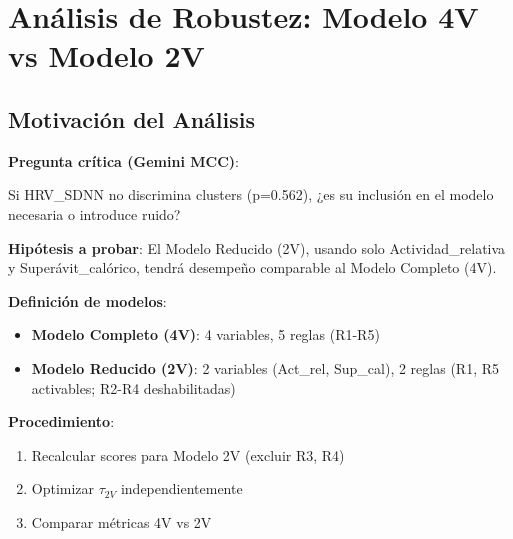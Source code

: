 \documentclass[12pt,letterpaper,twoside]{report}
\begin{document}
\section{Análisis de Robustez: Modelo 4V vs Modelo 2V}

\subsection{Motivación del Análisis}

\begin{hipotesisbox}
\textbf{Pregunta crítica (Gemini MCC)}:

Si HRV\_SDNN no discrimina clusters (p=0.562), ¿es su inclusión en el modelo necesaria o introduce ruido?

\textbf{Hipótesis a probar}: El Modelo Reducido (2V), usando solo Actividad\_relativa y Superávit\_calórico, tendrá desempeño comparable al Modelo Completo (4V).
\end{hipotesisbox}

\begin{estadisticobox}
\textbf{Definición de modelos}:

\begin{itemize}[noitemsep]
    \item \textbf{Modelo Completo (4V)}: 4 variables, 5 reglas (R1-R5)
    \item \textbf{Modelo Reducido (2V)}: 2 variables (Act\_rel, Sup\_cal), 2 reglas (R1, R5 activables; R2-R4 deshabilitadas)
\end{itemize}

\textbf{Procedimiento}:
\begin{enumerate}[noitemsep]
    \item Recalcular scores para Modelo 2V (excluir R3, R4)
    \item Optimizar $\tau_{2V}$ independientemente
    \item Comparar métricas 4V vs 2V
\end{enumerate}
\end{estadisticobox}
\end{document}
